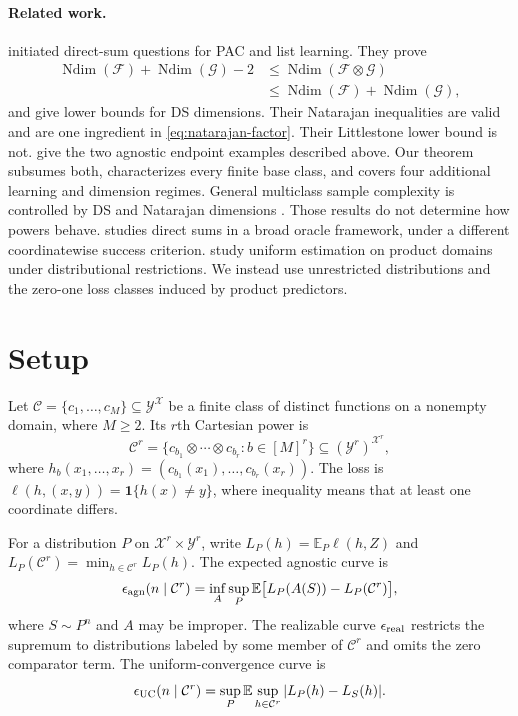 \documentclass[twoside]{article}
\newcommand{\E}{\mathbb E}
\newcommand{\C}{\mathcal C}
\newcommand{\Ndim}{\operatorname{Ndim}}
\begin{document}
\paragraph{Related work.} \citet{hanneke2024list,hanneke2024open} initiated direct-sum questions for PAC and list learning. They prove
\begin{align*}
 \Ndim(\mathcal F)+\Ndim(\mathcal G)-2
 &\leq \Ndim(\mathcal F\otimes\mathcal G)\\
 &\leq \Ndim(\mathcal F)+\Ndim(\mathcal G),
\end{align*}
and give lower bounds for DS dimensions. Their Natarajan inequalities are valid and are one ingredient in \eqref{eq:natarajan-factor}. Their Littlestone lower bound is not. \citet{more2026} give the two agnostic endpoint examples described above. Our theorem subsumes both, characterizes every finite base class, and covers four additional learning and dimension regimes. General multiclass sample complexity is controlled by DS and Natarajan dimensions \citep{brukhim2022,cohen2025,pabbaraju2026}. Those results do not determine how powers behave. \citet{suruga2024} studies direct sums in a broad oracle framework, under a different coordinatewise success criterion. \citet{holzman2026} study uniform estimation on product domains under distributional restrictions. We instead use unrestricted distributions and the zero-one loss classes induced by product predictors.

\section{Setup}
\label{sec:setup}

Let $\C=\{c_1,\ldots,c_M\}\subseteq\mathcal Y^{\mathcal X}$ be a finite class of distinct functions on a nonempty domain, where $M\geq2$. Its $r$th Cartesian power is \[ \C^r=\{c_{b_1}\otimes\cdots\otimes c_{b_r}:b\in[M]^r\}\subseteq(\mathcal Y^r)^{\mathcal X^r}, \] where $h_b(x_1,\ldots,x_r)=(c_{b_1}(x_1),\ldots,c_{b_r}(x_r))$. The loss is $\ell(h,(x,y))=\mathbf1\{h(x)\neq y\}$, where inequality means that at least one coordinate differs.

For a distribution $P$ on $\mathcal X^r\times\mathcal Y^r$, write $L_P(h)=\E_P\ell(h,Z)$ and $L_P(\C^r)=\min_{h\in\C^r}L_P(h)$. The expected agnostic curve is \[ \epsilon_{\rm agn}(n\mid\C^r)=\inf_A\sup_P \E\bigl[L_P(A(S))-L_P(\C^r)\bigr], \] where $S\sim P^n$ and $A$ may be improper. The realizable curve $\epsilon_{\rm real}$ restricts the supremum to distributions labeled by some member of $\C^r$ and omits the zero comparator term. The uniform-convergence curve is \[ \epsilon_{\rm UC}(n\mid\C^r)=\sup_P\E\sup_{h\in\C^r}|L_P(h)-L_S(h)|. \]
\end{document}
